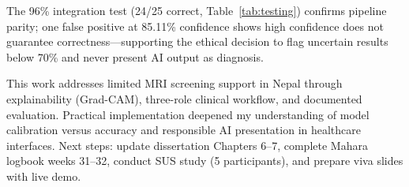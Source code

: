 \documentclass[11pt,a4paper]{article}
\begin{document}
The 96\% integration test (24/25 correct, Table~\ref{tab:testing}) confirms pipeline parity; one false positive at 85.11\% confidence shows high confidence does not guarantee correctness---supporting the ethical decision to flag uncertain results below 70\% and never present AI output as diagnosis.

This work addresses limited MRI screening support in Nepal through explainability (Grad-CAM), three-role clinical workflow, and documented evaluation. Practical implementation deepened my understanding of model calibration versus accuracy and responsible AI presentation in healthcare interfaces. Next steps: update dissertation Chapters 6--7, complete Mahara logbook weeks 31--32, conduct SUS study (5 participants), and prepare viva slides with live demo.
\end{document}
